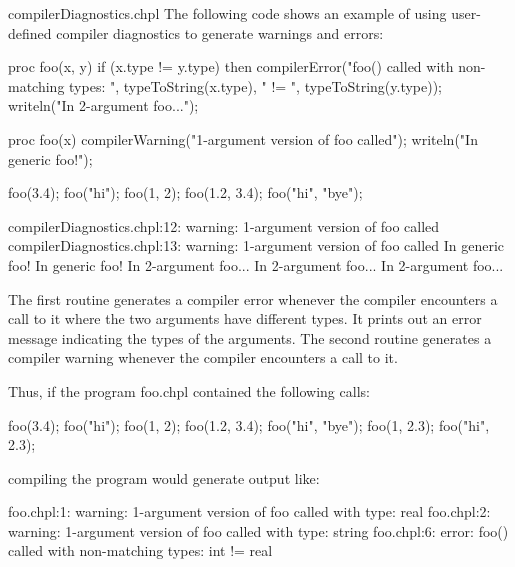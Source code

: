 \begin{chapelexample}{compilerDiagnostics.chpl}
The following code shows an example of using user-defined compiler
diagnostics to generate warnings and errors:
\begin{chapel}
proc foo(x, y) {
  if (x.type != y.type) then
    compilerError("foo() called with non-matching types: ", 
                  typeToString(x.type), " != ", typeToString(y.type));
  writeln("In 2-argument foo...");
}

proc foo(x) {
  compilerWarning("1-argument version of foo called");
  writeln("In generic foo!");
}
\end{chapel}
\begin{chapelpost}
foo(3.4);
foo("hi");
foo(1, 2);
foo(1.2, 3.4);
foo("hi", "bye");
\end{chapelpost}
\begin{chapeloutput}
compilerDiagnostics.chpl:12: warning: 1-argument version of foo called
compilerDiagnostics.chpl:13: warning: 1-argument version of foo called
In generic foo!
In generic foo!
In 2-argument foo...
In 2-argument foo...
In 2-argument foo...
\end{chapeloutput}

The first routine generates a compiler error whenever the compiler
encounters a call to it where the two arguments have different types.
It prints out an error message indicating the types of the arguments.
The second routine generates a compiler warning whenever the compiler
encounters a call to it.

Thus, if the program foo.chpl contained the following calls:

\begin{numberedchapel}
foo(3.4);
foo("hi");
foo(1, 2);
foo(1.2, 3.4);
foo("hi", "bye");
foo(1, 2.3);
foo("hi", 2.3);
\end{numberedchapel}

\noindent compiling the program would generate output like:

\begin{commandline}
foo.chpl:1: warning: 1-argument version of foo called with type: real
foo.chpl:2: warning: 1-argument version of foo called with type: string
foo.chpl:6: error: foo() called with non-matching types: int != real
\end{commandline}

\end{chapelexample}

